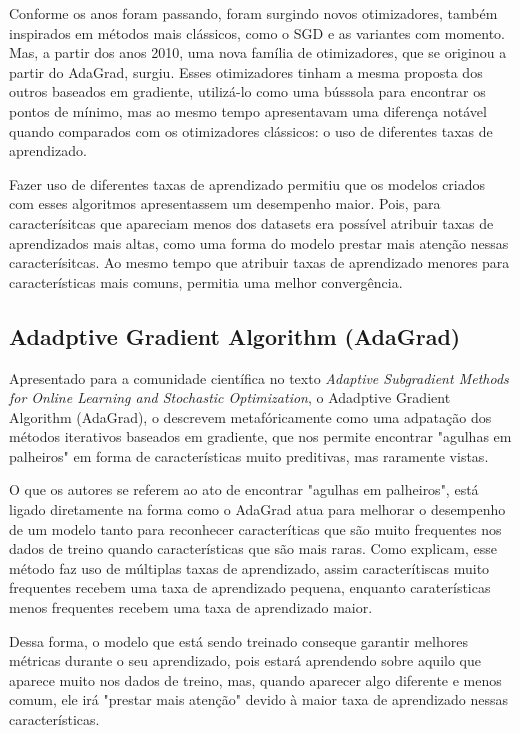 Conforme os anos foram passando, foram surgindo novos otimizadores, também inspirados em métodos mais clássicos, como o SGD e as variantes com momento. Mas, a partir dos anos 2010, uma nova família de otimizadores, que se originou a partir do AdaGrad, surgiu. Esses otimizadores tinham a mesma proposta dos outros baseados em gradiente, utilizá-lo como uma bússsola para encontrar os pontos de mínimo, mas ao mesmo tempo apresentavam uma diferença notável quando comparados com os otimizadores clássicos: o uso de diferentes taxas de aprendizado.

Fazer uso de diferentes taxas de aprendizado permitiu que os modelos criados com esses algoritmos apresentassem um desempenho maior. Pois, para caracterísitcas que apareciam menos dos datasets era possível atribuir taxas de aprendizados mais altas, como uma forma do modelo prestar mais atenção nessas caracterísitcas. Ao mesmo tempo que atribuir taxas de aprendizado menores para características mais comuns, permitia uma melhor convergência.

\subsection{Adadptive Gradient Algorithm (AdaGrad)}

Apresentado para a comunidade científica no texto \textit{Adaptive Subgradient Methods for Online Learning and Stochastic Optimization}, o Adadptive Gradient Algorithm (AdaGrad), \textcite{AdaGradMethod} o descrevem metafóricamente como uma adpatação dos métodos iterativos baseados em gradiente, que nos permite encontrar "agulhas em palheiros" em forma de características muito preditivas, mas raramente vistas.

O que os autores se referem ao ato de encontrar "agulhas em palheiros", está ligado diretamente na forma como o AdaGrad atua para melhorar o desempenho de um modelo tanto para reconhecer caracteríticas que são muito frequentes nos dados de treino quando características que são mais raras. Como \textcite{AdaGradMethod} explicam, esse método faz uso de múltiplas taxas de aprendizado, assim caracterítiscas muito frequentes recebem uma taxa de aprendizado pequena, enquanto caraterísticas menos frequentes recebem uma taxa de aprendizado maior.

Dessa forma, o modelo que está sendo treinado conseque garantir melhores métricas durante o seu aprendizado, pois estará aprendendo sobre aquilo que aparece muito nos dados de treino, mas, quando aparecer algo diferente e menos comum, ele irá "prestar mais atenção" devido à maior taxa de aprendizado nessas características.

